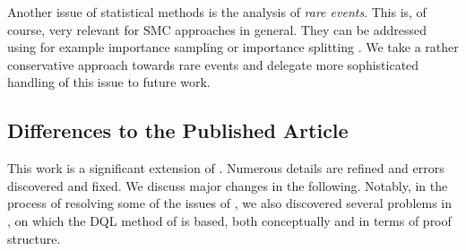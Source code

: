 \documentclass{article}
\begin{document}
Another issue of statistical methods is the analysis of \emph{rare events}.
This is, of course, very relevant for SMC approaches in general.
They can be addressed using for example importance sampling \cite{DBLP:conf/tacas/JegourelLS12,DBLP:conf/kbse/HeJBGW10} or importance splitting \cite{DBLP:conf/cav/JegourelLS13,DBLP:conf/setta/BuddeDH17}.
We take a rather conservative approach towards rare events and delegate more sophisticated handling of this issue to future work.



\subsection{Differences to the Published Article} \label{sec:intro:differences}

This work is a significant extension of \cite{DBLP:conf/atva/BrazdilCCFKKPU14}.
Numerous details are refined and errors discovered and fixed.
We discuss major changes in the following.
Notably, in the process of resolving some of the issues of \cite{DBLP:conf/atva/BrazdilCCFKKPU14}, we also discovered several problems in \cite{DBLP:conf/icml/StrehlLWLL06}, on which the DQL method of \cite{DBLP:conf/atva/BrazdilCCFKKPU14} is based, both conceptually and in terms of proof structure.
\end{document}
